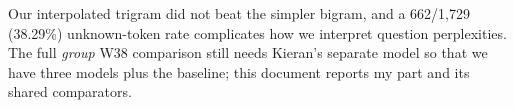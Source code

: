 \documentclass[10pt,a4paper]{article}
\begin{document}
 Our interpolated trigram did not beat the simpler bigram, and a 662/1,729 (38.29\%) unknown-token rate complicates how we interpret question perplexities. The full \emph{group} W38 comparison still needs Kieran's separate model so that we have three models plus the baseline; this document reports my part and its shared comparators.
\end{document}
